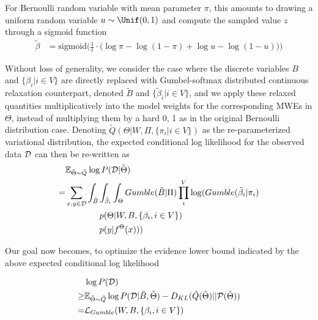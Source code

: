 For Bernoulli random variable with mean parameter $\pi$, this amounts to drawing a uniform random variable  $u \sim \Unif (0, 1)$ and compute the sampled value $z$
 through a sigmoid function \cite{gal2017concrete}
\begin{align}
\tilde{\beta} &= \text{sigmoid} \bigg(
\frac{1}{t} \cdot \big(
\log \pi
- \log (1 - \pi)
+ \log u
- \log (1 - u)
\big)
\bigg) \label{eq:gumbel-sample}
\end{align}


Without loss of generality, we consider the case where the discrete variables $B$ and $\{
\beta_i | i \in V\}$ are directly replaced with Gumbel-softmax distributed continuous relaxation counterpart, denoted $\tilde{B}$ and $ \{ \tilde{\beta}_i  | i \in V\}$, and 
we apply these relaxed quantities multiplicatively into the model weights for the corresponding MWEs in $\Theta$, 
instead of multiplying them by a hard 0, 1 as in the original Bernoulli distribution case.
Denoting $ \tilde{Q} (\Theta | W, \Pi, \{\pi_i | i \in V\})$ as the re-parameterized variational distribution, 
the expected conditional log likelihood for the observed data $\mathcal{D}$ can then be re-written as
\begin{align}
& \mathbb{E}_{\tilde{\Theta} \sim \tilde{Q}} \log P (\mathcalD | \tilde{\Theta}) \nonumber\\ 
= & \sum_{x, y \in \mathcalD} \int_{\tilde{B}} \int_{\tilde{\beta}_i}\int_{\Theta} Gumble(\tilde{B} | \Pi) \prod_i^{V} \log ( Gumble(\tilde{\beta}_i | \pi_i) \nonumber\\ 
& \quad \quad \quad \quad p(\Theta \vert W, B, \{\beta_i, i \in V\}) \nonumber\\ 
& \quad \quad \quad \quad p(y \vert f^{\Theta}(x)) )
\label{eq:exp-gumble}
\end{align}

Our goal now becomes, to optimize the evidence lower bound indicated by the above expected conditional log likelihood 

\begin{align}
    &\log P( \mathcalD ) \nonumber\\
    \geq& \mathbb{E}_{\tilde{\Theta} \sim \tilde{Q} } \log P (\mathcalD | \tilde{B}, \tilde{\Theta})  - D_{KL} ( \tilde{Q} ( \tilde{\Theta}) ||\mathcal{P}( \tilde{\Theta} )) \nonumber\\
    = & \mathcal{L}_{Gumble} (W, B, \{\beta_i, i \in V\}) \label{eq:elbo0}
\end{align}

